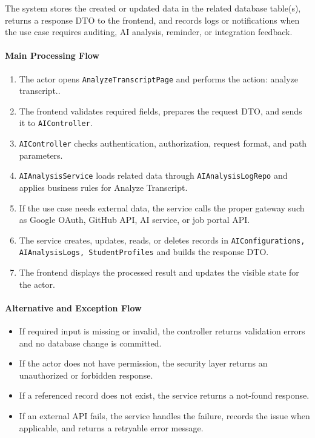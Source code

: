 The system stores the created or updated data in the related database table(s), returns a response DTO to the frontend, and records logs or notifications when the use case requires auditing, AI analysis, reminder, or integration feedback.

\paragraph{Main Processing Flow}

\begin{enumerate}
    \item The actor opens \texttt{AnalyzeTranscriptPage} and performs the action: analyze transcript..
    \item The frontend validates required fields, prepares the request DTO, and sends it to \texttt{AIController}.
    \item \texttt{AIController} checks authentication, authorization, request format, and path parameters.
    \item \texttt{AIAnalysisService} loads related data through \texttt{AIAnalysisLogRepo} and applies business rules for Analyze Transcript.
    \item If the use case needs external data, the service calls the proper gateway such as Google OAuth, GitHub API, AI service, or job portal API.
    \item The service creates, updates, reads, or deletes records in \texttt{AIConfigurations, AIAnalysisLogs, StudentProfiles} and builds the response DTO.
    \item The frontend displays the processed result and updates the visible state for the actor.
\end{enumerate}

\paragraph{Alternative and Exception Flow}

\begin{itemize}
    \item If required input is missing or invalid, the controller returns validation errors and no database change is committed.
    \item If the actor does not have permission, the security layer returns an unauthorized or forbidden response.
    \item If a referenced record does not exist, the service returns a not-found response.
    \item If an external API fails, the service handles the failure, records the issue when applicable, and returns a retryable error message.
\end{itemize}

